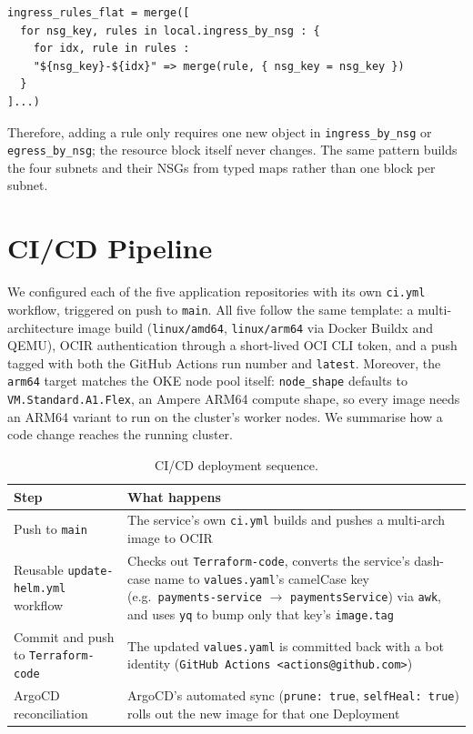 \begin{lstlisting}[caption={\texttt{modules/network/locals.tf} -- flattening per-subnet rule lists into one for\_each-able map}]
ingress_rules_flat = merge([
  for nsg_key, rules in local.ingress_by_nsg : {
    for idx, rule in rules :
    "${nsg_key}-${idx}" => merge(rule, { nsg_key = nsg_key })
  }
]...)
\end{lstlisting}

Therefore, adding a rule only requires one new object in \texttt{ingress\_by\_nsg} or
\texttt{egress\_by\_nsg}; the resource block itself never changes. The same pattern
builds the four subnets and their NSGs from typed maps rather than one block per
subnet.

\section{CI/CD Pipeline}\label{sec:evaluation-criteria}
We configured each of the five application repositories with its own \texttt{ci.yml} workflow,
triggered on push to \texttt{main}. All five follow the same template: a
multi-architecture image build (\texttt{linux/amd64}, \texttt{linux/arm64} via
Docker Buildx and QEMU), OCIR authentication through a short-lived OCI CLI token,
and a push tagged with both the GitHub Actions run number and \texttt{latest}.
Moreover, the \texttt{arm64} target matches the OKE node pool itself: \texttt{node\_shape}
defaults to \texttt{VM.Standard.A1.Flex}, an Ampere ARM64 compute shape, so every
image needs an ARM64 variant to run on the cluster's worker nodes.
We summarise how a code change reaches the running
cluster.

\begin{table}[H]
\centering
\caption{CI/CD deployment sequence.}
\label{tab:change-criteria}
\small
\begin{tabularx}{\textwidth}{>{\raggedright\arraybackslash}p{3.6cm}
                >{\raggedright\arraybackslash}X}
\toprule
\textbf{Step} & \textbf{What happens} \\
\midrule
Push to \texttt{main} & The service's own \texttt{ci.yml} builds and pushes a multi-arch image to OCIR \\
Reusable \texttt{update-helm.yml} workflow & Checks out \texttt{Terraform-code}, converts the service's dash-case name to \texttt{values.yaml}'s camelCase key (e.g.\ \texttt{payments-service} $\to$ \texttt{paymentsService}) via \texttt{awk}, and uses \texttt{yq} to bump only that key's \texttt{image.tag} \\
Commit and push to \texttt{Terraform-code} & The updated \texttt{values.yaml} is committed back with a bot identity (\texttt{GitHub Actions <actions@github.com>}) \\
ArgoCD reconciliation & ArgoCD's automated sync (\texttt{prune: true}, \texttt{selfHeal: true}) rolls out the new image for that one Deployment \\
\bottomrule
\end{tabularx}
\end{table}

